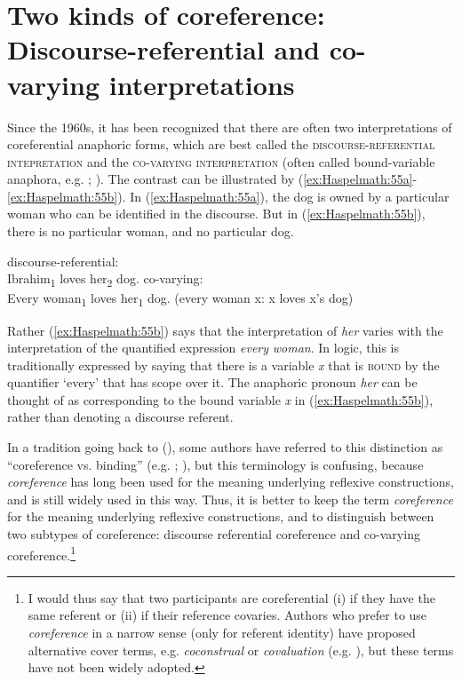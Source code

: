 \documentclass[output=paper]{langscibook}
\begin{document}
\section{Two kinds of coreference: Discourse-referential and co-varying interpretations}\label{sec:Haspelmath:13}
Since the 1960s, it has been recognized that there are often two interpretations of coreferential anaphoric forms, which are best called the \textsc{discourse-referential} \textsc{intepretation} and the \textsc{co-varying} \textsc{interpretation} (often called bound-variable anaphora, e.g. \citealt{Reinhart1983a}; \citealt{DéchaineWiltschko2017b}). The contrast can be illustrated by (\ref{ex:Haspelmath:55a}-\ref{ex:Haspelmath:55b}). In (\ref{ex:Haspelmath:55a}), the dog is owned by a particular woman who can be identified in the discourse. But in (\ref{ex:Haspelmath:55b}), there is no particular woman, and no particular dog.

\ea%
    \label{ex:Haspelmath:55}
    \ea \label{ex:Haspelmath:55a}
    discourse-referential: \\ {Ibrahim\textsubscript{1}} {loves} {her\textsubscript{2}} {dog.}
    \ex co-varying: \label{ex:Haspelmath:55b} \\
   {Every} {woman\textsubscript{1}} {loves} {her\textsubscript{1}} {dog.} (every woman {x}: {x} loves {x}’s dog)
    \z
\z 

Rather (\ref{ex:Haspelmath:55b}) says that the interpretation of \textit{her} varies with the interpretation of the quantified expression \textit{every} \textit{woman}. In logic, this is traditionally expressed by saying that there is a variable \textit{x} that is \textsc{bound} by the quantifier ‘every’ that has scope over it. The anaphoric pronoun \textit{her} can be thought of as corresponding to the bound variable \textit{x} in (\ref{ex:Haspelmath:55b}), rather than denoting a discourse referent.

  In a tradition going back to \citeauthor{Reinhart1983a} (\citeyear{Reinhart1983a, Reinhart1983b}), some authors have referred to this distinction as “coreference vs. binding” (e.g. \citealt[\S9.1]{HeimKratzer1998}; \citealt[\S 1.6.1]{Reuland2011}), but this terminology is confusing, because \textit{coreference} has long been used for the meaning underlying reflexive constructions, and is still widely used in this way. Thus, it is better to keep the term \textit{coreference} for the meaning underlying reflexive constructions, and to distinguish between two subtypes of coreference: discourse referential coreference and co-varying coreference.\footnote{ {I would thus say that two participants are coreferential (i) if they have the same referent or (ii) if their reference covaries. Authors who prefer to use} {\textit{coreference}} {in a narrow sense (only for referent identity) have proposed alternative cover terms, e.g.} {\textit{coconstrual}} {\citep{Safir2005} or} {\textit{covaluation}} {(e.g. \citealt{Reinhart2006}), but these terms have not been widely adopted.}}
\end{document}
